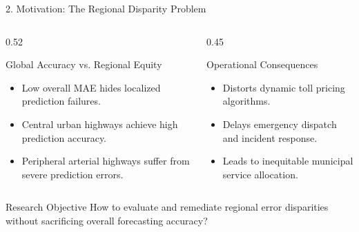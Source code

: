 \documentclass[aspectratio=169, 10pt]{beamer}
\begin{document}
\begin{frame}{2. Motivation: The Regional Disparity Problem}
  \begin{columns}
    \begin{column}{0.52\textwidth}
      \begin{block}{Global Accuracy vs. Regional Equity}
        \begin{itemize}
          \item Low overall MAE hides localized prediction failures.
          \item Central urban highways achieve high prediction accuracy.
          \item Peripheral arterial highways suffer from severe prediction errors.
        \end{itemize}
      \end{block}
    \end{column}
    \begin{column}{0.45\textwidth}
      \begin{block}{Operational Consequences}
        \begin{itemize}
          \item Distorts dynamic toll pricing algorithms.
          \item Delays emergency dispatch and incident response.
          \item Leads to inequitable municipal service allocation.
        \end{itemize}
      \end{block}
    \end{column}
  \end{columns}

  \vspace{0.3cm}

  \begin{alertblock}{Research Objective}
    How to evaluate and remediate regional error disparities without sacrificing overall forecasting accuracy?
  \end{alertblock}
\end{frame}
\end{document}
